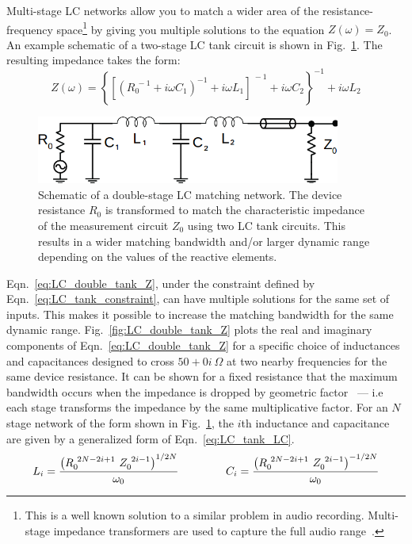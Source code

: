 Multi-stage LC networks allow you to match a wider area of the resistance-frequency space\footnote{This is a well known solution to a similar problem in audio recording. Multi-stage impedance transformers are used to capture the full audio range~\cite{horowitz_art_1989}.} by giving you multiple solutions to the equation $Z(\omega)=Z_0$. An example schematic of a two-stage LC tank circuit is shown in Fig.~\ref{fig:schematic_double_matching}. The resulting impedance takes the form:
\begin{equation}\label{eq:LC_double_tank_Z}
Z(\omega) = \left\lbrace\left[\left(R_0^{~-1}+i\omega C_1\right)^{-1}+i\omega L_1\right]^{~-1}+i\omega C_2\right\rbrace^{-1}+i\omega L_2
\end{equation}
\begin{figure}
\centering
\includegraphics[width=100mm]{figures/Johnson_noise_thermometry/schematic_double_matching}
\caption{Schematic of a double-stage LC matching network. The device resistance $R_0$ is transformed to match the characteristic impedance of the measurement circuit $Z_0$ using two LC tank circuits. This results in a wider matching bandwidth and/or larger dynamic range depending on the values of the reactive elements.}
\label{fig:schematic_double_matching}
\end{figure}
Eqn.~\ref{eq:LC_double_tank_Z}, under the constraint defined by Eqn.~\ref{eq:LC_tank_constraint}, can have multiple solutions for the same set of inputs. This makes it possible to increase the matching bandwidth for the same dynamic range. Fig.~\ref{fig:LC_double_tank_Z} plots the real and imaginary components of Eqn.~\ref{eq:LC_double_tank_Z} for a specific choice of inductances and capacitances designed to cross $50+0i~\Omega$ at two nearby frequencies for the same device resistance. It can be shown for a fixed resistance that the maximum bandwidth occurs when the impedance is dropped by geometric factor~\cite{pozar_microwave_2011} --- i.e each stage transforms the impedance by the same multiplicative factor. For an $N$ stage network of the form shown in Fig.~\ref{fig:schematic_double_matching}, the $i$th inductance and capacitance are given by a generalized form of Eqn.~\ref{eq:LC_tank_LC}. 
\begin{equation}\label{eq:LC_double_tank_LC}
L_i = \frac{\left(R_0^{~2N-2i+1}~Z_0^{~2i-1}\right)^{1/2N}}{\omega_0}
\hspace{15mm}
C_i = \frac{\left(R_0^{~2N-2i+1}~Z_0^{~2i-1}\right)^{-1/2N}}{\omega_0}
\end{equation}
